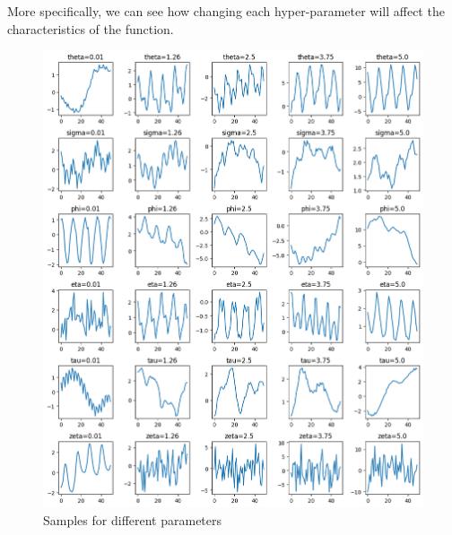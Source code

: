 \documentclass[12pt]{article}
\begin{document}
\newpage
More specifically, we can see how changing each hyper-parameter will affect the characteristics of the function.

\begin{figure}[h]
\centering
\begin{minipage}{.5\textwidth}
\includegraphics[scale = 0.35]{outputs/q2/c-parameter-samples}
\caption{Samples for different parameters}
\label{fig:fig2-c-parameter-samples}
  \centering
\end{minipage}%
\begin{minipage}{.5\textwidth}
  \centering

\end{minipage}
\end{figure}
\end{document}
